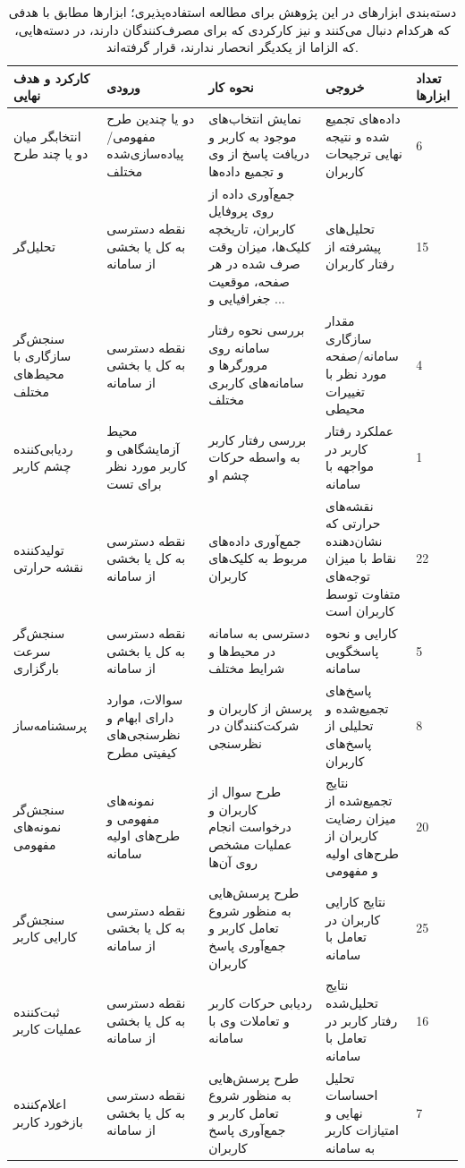 	\begin{table}[H]
	\caption[دسته‌بندی ابزارهای مطرح در این پژوهش برای مطالعه استفاده‌پذیری]{
		دسته‌بندی ابزارهای در این پژوهش برای مطالعه استفاده‌پذیری؛ ابزارها مطابق با هدفی که هرکدام دنبال می‌کنند و نیز کارکردی که برای مصرف‌کنندگان دارند، در دسته‌هایی، که الزاما از یکدیگر انحصار ندارند، قرار گرفته‌اند.
	}
	\label{tab:tools_category}
	\centering
	\begin{tabular}{|C{3cm}|C{3.2cm}|C{3.2cm}|C{3.2cm}|C{0.8cm}|}
		\hline
		کارکرد و هدف نهایی & ورودی & نحوه کار & خروجی & تعداد ابزارها \\ \hline
		انتخابگر میان دو یا چند طرح & دو یا چندین طرح مفهومی/پیاده‌سازی‌شده مختلف & نمایش انتخاب‌های موجود به کاربر و دریافت پاسخ از وی و تجمیع داده‌ها & داده‌های تجمیع شده و نتیجه نهایی ترجیحات کاربران & 6 \\ \hline
		تحلیل‌گر & نقطه دسترسی به کل یا بخشی از سامانه & جمع‌آوری داده از روی پروفایل کاربران، تاریخچه کلیک‌ها، میزان وقت صرف شده در هر صفحه، موقعیت جغرافیایی و ... & تحلیل‌های پیشرفته از رفتار کاربران & 15 \\ \hline
		سنجش‌گر سازگاری با محیط‌های مختلف & نقطه دسترسی به کل یا بخشی از سامانه & بررسی نحوه رفتار سامانه  روی مرورگرها و سامانه‌های کاربری مختلف & مقدار سازگاری سامانه/صفحه مورد نظر با تغییرات محیطی & 4 \\ \hline
		ردیابی‌کننده  چشم کاربر & محیط آزمایشگاهی و کاربر مورد نظر برای تست & بررسی رفتار کاربر به واسطه حرکات چشم او & عملکرد رفتار کاربر در مواجهه با سامانه & 1 \\ \hline
		تولیدکننده نقشه حرارتی & نقطه دسترسی به کل یا بخشی از سامانه & جمع‌‌آوری داده‌های مربوط به کلیک‌های کاربران & نقشه‌های حرارتی که نشان‌دهنده نقاط با میزان توجه‌های متفاوت توسط کاربران است & 22 \\ \hline
		سنجش‌‌گر سرعت بارگزاری & نقطه دسترسی به کل یا بخشی از سامانه & دسترسی به سامانه در محیط‌ها و شرایط مختلف & کارایی و نحوه پاسخگویی سامانه & 5 \\ \hline
		پرسشنامه‌ساز & سوالات، موارد دارای ابهام و نظرسنجی‌های کیفیتی مطرح & پرسش از کاربران و شرکت‌کنندگان در نظرسنجی & پاسخ‌های تجمیع‌شده و تحلیلی از پاسخ‌های کاربران & 8 \\ \hline
		سنجش‌گر نمونه‌های مفهومی & نمونه‌های مفهومی و طرح‌های اولیه سامانه & طرح سوال از کاربران و درخواست انجام عملیات مشخص روی آن‌ها & نتایج تجمیع‌شده از میزان رضایت کاربران از طرح‌های اولیه و مفهومی & 20 \\ \hline
		سنجش‌گر کارایی کاربر & نقطه دسترسی به کل یا بخشی از سامانه & طرح پرسش‌هایی به منظور شروع تعامل کاربر و جمع‌آوری پاسخ کاربران & نتایج کارایی کاربران در تعامل با سامانه & 25 \\ \hline
		ثبت‌کننده عملیات کاربر & نقطه دسترسی به کل یا بخشی از سامانه & ردیابی حرکات کاربر و تعاملات وی با سامانه & نتایج تحلیل‌شده رفتار کاربر در تعامل با سامانه & 16 \\ \hline
		اعلام‌کننده بازخورد کاربر & نقطه دسترسی به کل یا بخشی از سامانه & طرح پرسش‌هایی به منظور شروع تعامل کاربر و جمع‌آوری پاسخ کاربران & تحلیل احساسات نهایی و امتیازات کاربر به سامانه & 7 \\ \hline
	\end{tabular}
\end{table}
